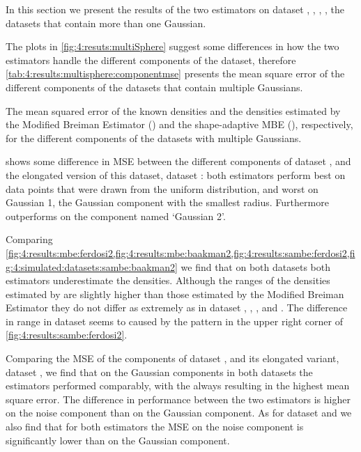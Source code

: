 In this section we present the results of the two estimators on dataset \ferdosiTwo, \baakmanTwo, \ferdosiThree, \baakmanThree, \ie the datasets that contain more than one Gaussian.

The plots in \cref{fig:4:resuts:multiSphere} suggest some differences in how the two estimators handle the different components of the dataset, therefore \cref{tab:4:results:multisphere:componentmse} presents the mean square error of the different components of the datasets that contain multiple Gaussians. 

\begin{table*}
	\centering
	
	\caption{The mean squared error of the known densities and the densities estimated by the Modified Breiman Estimator (\mbe) and the shape-adaptive MBE (\sambe), respectively, for the different components of the datasets with multiple Gaussians.} 	
	\label{tab:4:results:multisphere:componentmse}
\end{table*}

	 shows some difference in MSE between the different components of dataset \ferdosiTwo, and the elongated version of this dataset, \ie dataset \baakmanTwo: both estimators perform best on data points that were drawn from the uniform distribution, and worst on Gaussian 1, the Gaussian component with the smallest radius. Furthermore \sambe outperforms \mbe on the component named `Gaussian 2'.

	Comparing \cref{fig:4:results:mbe:ferdosi2,fig:4:results:mbe:baakman2,fig:4:results:sambe:ferdosi2,fig:4:simulated:datasets:sambe:baakman2} we find that on both datasets both estimators underestimate the densities. Although the ranges of the densities estimated by \sambe are slightly higher than those estimated by the Modified Breiman Estimator they do not differ as extremely as in dataset \ferdosiOne, \baakmanOne, \baakmanFour, and \baakmanFive. The difference in range in dataset \ferdosiTwo seems to caused by the pattern in the upper right corner of \cref{fig:4:results:sambe:ferdosi2}.

	Comparing the MSE of the components of dataset \ferdosiThree, and its elongated variant, dataset \baakmanThree, we find that on the Gaussian components in both datasets the estimators performed comparably, with the \sambe always resulting in the highest mean square error. The difference in performance between the two estimators is higher on the noise component than on the Gaussian component. As for dataset \ferdosiTwo and \baakmanTwo we also find that for both estimators the MSE on the noise component is significantly lower than on the Gaussian component.

